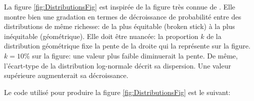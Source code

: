 \documentclass[
  11pt,
  french,
  a4paper,
  extrafontsizes,onecolumn,openright
  ]{memoir}
\begin{document}
\normalsize

La figure \ref{fig:DistributionsFig} est inspirée de la figure très connue de \textcite{Magurran1988}.
Elle montre bien une gradation en termes de décroissance de probabilité entre des distributions de même richesse: de la plus équitable (broken stick) à la plus inéquitable (géométrique).
Elle doit être nuancée: la proportion \(k\) de la distribution géométrique fixe la pente de la droite qui la représente sur la figure.
\(k=10\%\) sur la figure: une valeur plus faible diminuerait la pente.
De même, l'écart-type de la distribution log-normale décrit sa dispersion.
Une valeur supérieure augmenterait sa décroissance.

Le code utilisé pour produire la figure \ref{fig:DistributionsFig} est le suivant:

\scriptsize
\end{document}
